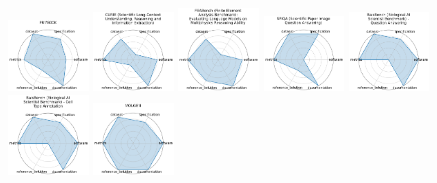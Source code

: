 \begin{figure}[ht!]
\\[1ex]
\includegraphics[width=0.1900\textwidth]{images/prmk_radar.pdf}
\includegraphics[width=0.1900\textwidth]{images/curie_scientific_long-context_understanding_reasoning_and_information_extraction_radar.pdf}
\includegraphics[width=0.1900\textwidth]{images/feabench_finite_element_analysis_benchmark_evaluating_language_models_on_multiphysics_reasoning_ability_radar.pdf}
\includegraphics[width=0.1900\textwidth]{images/spiqa_scientific_paper_image_question_answering_radar.pdf}
\includegraphics[width=0.1900\textwidth]{images/baisbench_biological_ai_scientist_benchmark_-_question_answering_radar.pdf}
\\[1ex]
\includegraphics[width=0.1900\textwidth]{images/baisbench_biological_ai_scientist_benchmark_-_cell_type_annotation_radar.pdf}
\includegraphics[width=0.1900\textwidth]{images/molgen_radar.pdf}

\end{figure}
